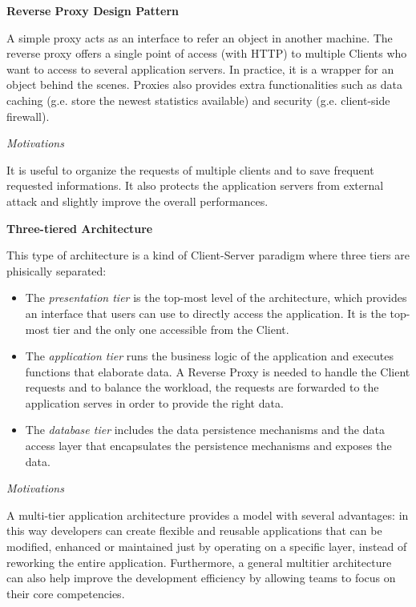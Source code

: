 \documentclass{report}
\begin{document}
\vspace{2mm}
\begin{center}\large{\textbf{Reverse Proxy Design Pattern}}\end{center}
    A simple proxy acts as an interface to refer an object in another machine. The reverse proxy offers a single point of access (with HTTP) to multiple Clients who want to access to several application servers. In practice, it is a wrapper for an object behind the scenes. 
    Proxies also provides extra functionalities such as data caching (g.e. store the newest statistics available) and security (g.e. client-side firewall).
    \begin{center}\large{\textit{Motivations}}\end{center} 
    It is useful to organize the requests of multiple clients and to save frequent requested informations. It also protects the application servers from external attack and slightly improve the overall performances.
    
\vspace{2mm}
\begin{center}\large{\textbf{Three-tiered Architecture}}\end{center}
This type of architecture is a kind of Client-Server paradigm where three tiers are phisically separated:
\begin{itemize}
	\item The \textit{presentation tier} is the top-most level of the architecture, which provides an interface that users can use to directly access the application. 
	It is the top-most tier and the only one accessible from the Client.
	\item The \textit{application tier} runs the business logic of the application and executes functions that elaborate data. 
	A Reverse Proxy is needed to handle the Client requests and to balance the workload, the requests are forwarded to 
	the application serves in order to provide the right data.
	\item The \textit{database tier} includes the data persistence mechanisms and the data access layer that encapsulates 
	the persistence mechanisms and exposes the data.
\end{itemize}
\begin{center}\large{\textit{Motivations}}\end{center}
A multi-tier application architecture provides a model with several advantages: in this way developers can create flexible and reusable 
applications that can be modified, enhanced or maintained just by operating on a specific layer, instead of reworking the entire application. Furthermore, a general multitier architecture can also help improve the development efficiency by allowing teams to focus on their core competencies.
\end{document}
